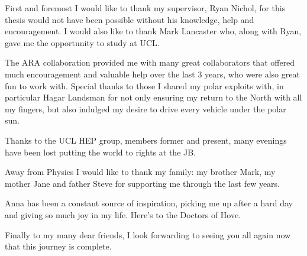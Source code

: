 First and foremost I would like to thank my supervisor, Ryan Nichol, for this thesis would not have been possible without his knowledge, help and encouragement. I would also like to thank Mark Lancaster who, along with Ryan, gave me the opportunity to study at UCL.

The ARA collaboration provided me with many great collaborators that offered much encouragement and valuable help over the last 3 years, who were also great fun to work with. Special thanks to those I shared my polar exploits with, in particular Hagar Landsman for not only ensuring my return to the North with all my fingers, but also indulged my desire to drive every vehicle under the polar sun. 

Thanks to the UCL HEP group, members former and present,  many evenings have been lost putting the world to rights at the JB.

Away from Physics I would like to thank my family: my brother Mark, my mother Jane and father Steve for supporting me through the last few years. 

Anna has been a constant source of inspiration, picking me up after a hard day and giving so much joy in my life. Here's to the Doctors of Hove.

Finally to my many dear friends, I look forwarding to seeing you all again now that this journey is complete.




